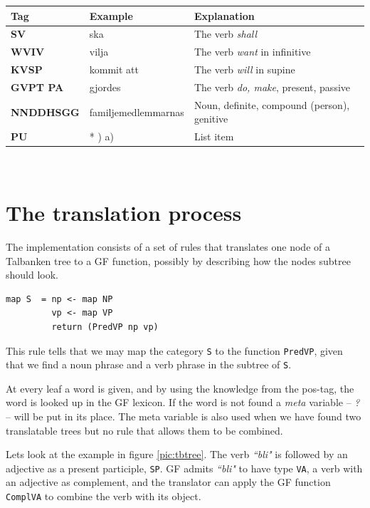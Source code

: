 \documentclass{report}
\begin{document}
\begin{tabular}{lll}
\textbf{Tag} & \textbf{Example} & \textbf{Explanation} \\
\hline
\textbf{SV} & ska & The verb \emph{shall}\\
\textbf{WVIV} & vilja & The verb \emph{want} in infinitive\\
\textbf{KVSP} & kommit att & The verb \emph{will} in supine\\
\textbf{GVPT  PA} & gjordes & The verb \emph{do, make}, present, passive \\
\textbf{NNDDHSGG} & familjemedlemmarnas & Noun, definite, compound (person), genitive \\
\textbf{PU} & * \; 1) \; a) & List item\\
\end{tabular}\\


\section{The translation process}
The implementation consists of a set of rules that translates
one node of a Talbanken tree to a GF function, possibly by describing how the
nodes subtree should look. 
\begin{verbatim}
map S  = np <- map NP
         vp <- map VP
         return (PredVP np vp)
\end{verbatim}
This rule tells that we may map the category \verb-S- to the function 
\verb-PredVP-, given that we find a noun phrase and a verb phrase in
the subtree of \verb-S-.

At every leaf a word is given, %
and by using the knowledge from the pos-tag, the word is looked up in the GF
lexicon. If the word is not found
a \textit{meta} variable -- \textit{?} -- will be put in its place.
The meta variable is also used when we have found two translatable trees
but no rule that allows them to be combined.

Lets look at the example in figure
\ref{pic:tbtree}. The verb \emph{``bli"} is
followed by an
adjective as a present participle, \verb|SP|. GF admits \emph{``bli"} to have
type \verb|VA|, a verb with an adjective as complement, and the translator can
apply the GF function \verb|ComplVA| to combine the verb with its object. \\
\end{document}
